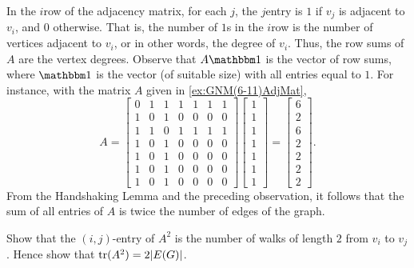 In the $i$\nth row of the adjacency matrix, for each $j$, the $j$\nth entry is $1$ if $v_j$ is adjacent to $v_i$, and $0$ otherwise. That is, the number of $1$s in the $i$\nth row is the number of vertices adjacent to $v_i$, or in other words, the degree of $v_i$. Thus, the row sums of $A$ are the vertex degrees. Observe that $A \mathbbm 1$ is the vector of row sums, where $\mathbbm 1$ is the vector (of suitable size) with all entries equal to $1$. For instance, with the matrix $A$ given in \cref{ex:GNM(6-11)AdjMat},
\begin{equation*}
A = \begin{bmatrix}
0 & 1 & 1 & 1 & 1 & 1 & 1 \\
1 & 0 & 1 & 0 & 0 & 0 & 0 \\
1 & 1 & 0 & 1 & 1 & 1 & 1 \\
1 & 0 & 1 & 0 & 0 & 0 & 0 \\
1 & 0 & 1 & 0 & 0 & 0 & 0 \\
1 & 0 & 1 & 0 & 0 & 0 & 0 \\
1 & 0 & 1 & 0 & 0 & 0 & 0
\end{bmatrix}
\begin{bmatrix}
1 \\ 1 \\ 1 \\ 1 \\ 1 \\ 1 \\ 1
\end{bmatrix} =
\begin{bmatrix}
6 \\ 2 \\ 6 \\ 2 \\ 2 \\ 2 \\ 2
\end{bmatrix}.
\end{equation*}
From the Handshaking Lemma and the preceding observation, it follows that the sum of all entries of $A$ is twice the number of edges of the graph.

\begin{Exercise}\label{exer:A2ij}
Show that the $(i,j)$-entry of $A^2$ is the number of walks of length $2$ from $v_i$ to $v_j$. Hence show that $\trace(A^2) = 2|E(G)|$.\\
\end{Exercise}

